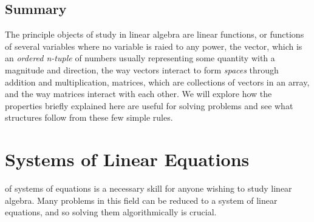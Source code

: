 \documentclass{tufte-book}
\begin{document}
\section{Summary}

The principle objects of study in linear algebra are linear functions, or functions
of several variables where no variable is raied to any power, the vector, which is an \emph{ordered n-tuple} of numbers
usually representing some quantity with a magnitude and direction, the way vectors interact to form \emph{spaces}
through addition and multiplication, matrices, which are collections of vectors in an array, and the way matrices
interact with each other. We will explore how the properties briefly explained here are useful for solving problems
and see what structures follow from these few simple rules.

\chapter{Systems of Linear Equations}

 of systems of equations is a necessary skill for anyone wishing to study linear
algebra. Many problems in this field can be reduced to a system of linear equations, and so solving them
algorithmically is crucial.
\end{document}
